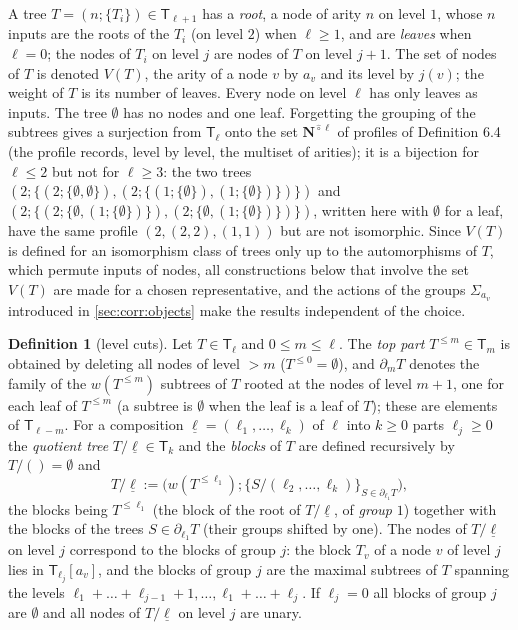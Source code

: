 \documentclass[12pt]{article}
\theoremstyle{plain}
\theoremstyle{definition}
\newtheorem{cdefinition}[ctheorem]{Definition}
\theoremstyle{remark}
\newcommand{\Ncirc}[1]{\mathbf{N}^{\hat{\circ}#1}}
\newcommand{\Tr}{\mathsf{T}}
\newcommand{\wt}{w}
\begin{document}
A tree $T=(n;\{T_i\})\in\Tr_{\ell+1}$ has a \emph{root}, a node of arity $n$ on level $1$, whose $n$ inputs are the roots of the $T_i$ (on level $2$) when $\ell\geq1$, and are \emph{leaves} when $\ell=0$; the nodes of $T_i$ on level $j$ are nodes of $T$ on level $j+1$. The set of nodes of $T$ is denoted $V(T)$, the arity of a node $v$ by $a_v$ and its level by $j(v)$; the weight of $T$ is its number of leaves. Every node on level $\ell$ has only leaves as inputs. The tree $\emptyset$ has no nodes and one leaf. Forgetting the grouping of the subtrees gives a surjection from $\Tr_\ell$ onto the set $\Ncirc{\ell}$ of profiles of Definition 6.4 (the profile records, level by level, the multiset of arities); it is a bijection for $\ell\leq2$ but not for $\ell\geq3$: the two trees $(2;\{(2;\{\emptyset,\emptyset\}),(2;\{(1;\{\emptyset\}),(1;\{\emptyset\})\})\})$ and $(2;\{(2;\{\emptyset,(1;\{\emptyset\})\}),(2;\{\emptyset,(1;\{\emptyset\})\})\})$, written here with $\emptyset$ for a leaf, have the same profile $(2,(2,2),(1,1))$ but are not isomorphic. Since $V(T)$ is defined for an isomorphism class of trees only up to the automorphisms of $T$, which permute inputs of nodes, all constructions below that involve the set $V(T)$ are made for a chosen representative, and the actions of the groups $\Sigma_{a_v}$ introduced in \ref{sec:corr:objects} make the results independent of the choice.

\begin{cdefinition}[level cuts]\label{cdef:cut}
Let $T\in\Tr_\ell$ and $0\leq m\leq\ell$. The \emph{top part} $T^{\leq m}\in\Tr_m$ is obtained by deleting all nodes of level $>m$ ($T^{\leq0}=\emptyset$), and $\partial_mT$ denotes the family of the $\wt(T^{\leq m})$ subtrees of $T$ rooted at the nodes of level $m+1$, one for each leaf of $T^{\leq m}$ (a subtree is $\emptyset$ when the leaf is a leaf of $T$); these are elements of $\Tr_{\ell-m}$. For a composition $\underline\ell=(\ell_1,\dots,\ell_k)$ of $\ell$ into $k\geq0$ parts $\ell_j\geq0$ the \emph{quotient tree} $T/\underline\ell\in\Tr_k$ and the \emph{blocks} of $T$ are defined recursively by $T/()=\emptyset$ and
\[T/\underline\ell:=\big(\wt(T^{\leq\ell_1});\{S/(\ell_2,\dots,\ell_k)\}_{S\in\partial_{\ell_1}T}\big),\]
the blocks being $T^{\leq\ell_1}$ (the block of the root of $T/\underline\ell$, of \emph{group} $1$) together with the blocks of the trees $S\in\partial_{\ell_1}T$ (their groups shifted by one). The nodes of $T/\underline\ell$ on level $j$ correspond to the blocks of group $j$: the block $T_v$ of a node $v$ of level $j$ lies in $\Tr_{\ell_j}[a_v]$, and the blocks of group $j$ are the maximal subtrees of $T$ spanning the levels $\ell_1+\dots+\ell_{j-1}+1,\dots,\ell_1+\dots+\ell_j$. If $\ell_j=0$ all blocks of group $j$ are $\emptyset$ and all nodes of $T/\underline\ell$ on level $j$ are unary.
\end{cdefinition}
\end{document}
